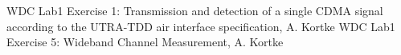 


	

	
	
%	
%	
%	
	

	
	
	
	\begin{thebibliography}{99}
	 WDC Lab1 Exercise 1: Transmission and detection of a single CDMA signal according to the UTRA-TDD air interface specification, A. Kortke
	 WDC Lab1 Exercise 5: Wideband Channel Measurement, A. Kortke
		
	\end{thebibliography}
	
	
